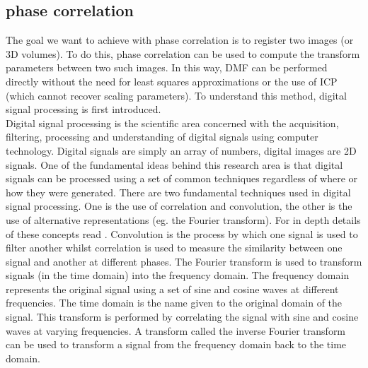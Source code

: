 \subsection{phase correlation}

The goal we want to achieve with phase correlation is to register two images (or 3D volumes). To do this, phase correlation can be used to compute the transform parameters between two such images. In this way, DMF can be performed directly without the need for least squares approximations or the use of ICP (which cannot recover scaling parameters). To understand this method, digital signal processing is first introduced. \\ 

Digital signal processing is the scientific area concerned with the acquisition, filtering, processing and understanding of digital signals using computer technology. Digital signals are simply an array of numbers, digital images are 2D signals. One of the fundamental ideas behind this research area is that digital signals can be processed using a set of common techniques regardless of where or how they were generated. There are two fundamental techniques used in digital signal processing. One is the use of correlation and convolution, the other is the use of alternative representations (eg. the Fourier transform). For in depth details of these concepts read \cite{Smith97Scientist}. Convolution is the process by which one signal is used to filter another whilst correlation is used to measure the similarity between one signal and another at different phases. The Fourier transform is used to transform signals (in the time domain) into the frequency domain. The frequency domain represents the original signal using a set of sine and cosine waves at different frequencies. The time domain is the name given to the original domain of the signal. This transform is performed by correlating the signal with sine and cosine waves at varying frequencies. A transform called the inverse Fourier transform can be used to transform a signal from the frequency domain back to the time domain. \\

